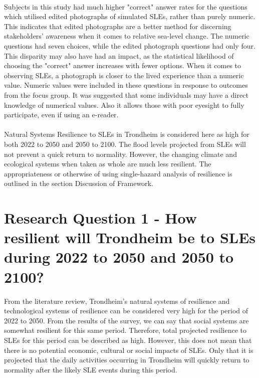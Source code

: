 \paragraph{}
Subjects in this study had much higher "correct" answer rates for the questions which utilised edited photographs of simulated SLEs, rather than purely numeric. This indicates that edited photographs are a better method for discerning stakeholders' awareness when it comes to relative sea-level change. The numeric questions had seven choices, while the edited photograph questions had only four. This disparity may also have had an impact, as the statistical likelihood of choosing the "correct" answer increases with fewer options. When it comes to  observing SLEs, a photograph is closer to the lived experience than a numeric value. Numeric values were included in these questions in response to outcomes from the focus group. It was suggested that some individuals may have a direct knowledge of numerical values. Also it allows those with poor eyesight to fully participate, even if using an e-reader.
\paragraph{}
Natural Systems Resilience to SLEs in Trondheim is considered here as high for both 2022 to 2050 and 2050 to 2100. The flood levels projected from SLEs will not prevent a quick return to normality. However, the changing climate and ecological systems when taken as whole are much less resilient. The appropriateness or otherwise of using single-hazard analysis of resilience is outlined in the section Discussion of Framework.









\section{Research Question 1 - How resilient will Trondheim be to SLEs during 2022 to 2050 and 2050 to 2100? } \label{RQ1-findings}
From the literature review, Trondheim's natural systems of resilience and technological systems of resilience can be considered very high for the period of 2022 to 2050. From the results of the survey,  we can say that social systems are somewhat resilient for this same period. Therefore, total projected resilience to SLEs for this period can be described as high. However, this does not mean that there is no potential economic, cultural or social impacts of SLEs. Only that it is projected that the daily activities occurring in Trondheim will quickly return to normality after the likely SLE events during this period.
